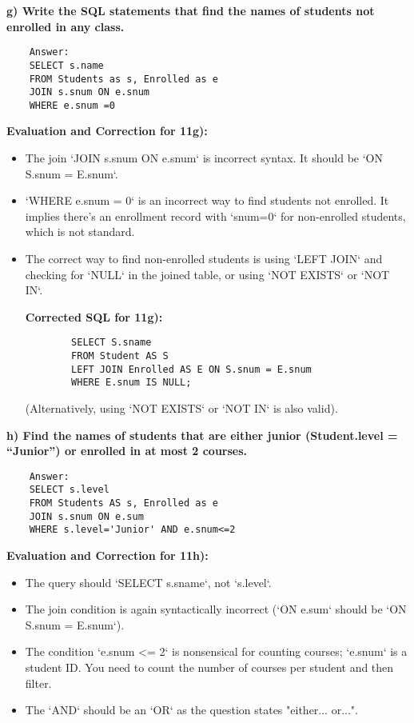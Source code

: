 \documentclass{article}
\begin{document}
\begin{enumerate}[label=\textbf{Question \arabic*.}]
    \textbf{g) Write the SQL statements that find the names of students not enrolled in any class.}
    \begin{lstlisting}
    Answer:
    SELECT s.name
    FROM Students as s, Enrolled as e
    JOIN s.snum ON e.snum
    WHERE e.snum =0
    \end{lstlisting}
    \textbf{Evaluation and Correction for 11g):}
    \begin{itemize}
        \item The join `JOIN s.snum ON e.snum` is incorrect syntax. It should be `ON S.snum = E.snum`.
        \item `WHERE e.snum = 0` is an incorrect way to find students not enrolled. It implies there's an enrollment record with `snum=0` for non-enrolled students, which is not standard.
        \item The correct way to find non-enrolled students is using `LEFT JOIN` and checking for `NULL` in the joined table, or using `NOT EXISTS` or `NOT IN`.

        \textbf{Corrected SQL for 11g):}
        \begin{lstlisting}
        SELECT S.sname
        FROM Student AS S
        LEFT JOIN Enrolled AS E ON S.snum = E.snum
        WHERE E.snum IS NULL;
        \end{lstlisting}
        (Alternatively, using `NOT EXISTS` or `NOT IN` is also valid).
    \end{itemize}

    \textbf{h) Find the names of students that are either junior (Student.level = “Junior”) or enrolled in at most 2 courses.}
    \begin{lstlisting}
    Answer:
    SELECT s.level
    FROM Students AS s, Enrolled as e
    JOIN s.snum ON e.sum
    WHERE s.level='Junior' AND e.snum<=2
    \end{lstlisting}
    \textbf{Evaluation and Correction for 11h):}
    \begin{itemize}
        \item The query should `SELECT s.sname`, not `s.level`.
        \item The join condition is again syntactically incorrect (`ON e.sum` should be `ON S.snum = E.snum`).
        \item The condition `e.snum <= 2` is nonsensical for counting courses; `e.snum` is a student ID. You need to count the number of courses per student and then filter.
        \item The `AND` should be an `OR` as the question states "either... or...".


\end{itemize}
\end{enumerate}
\end{document}
